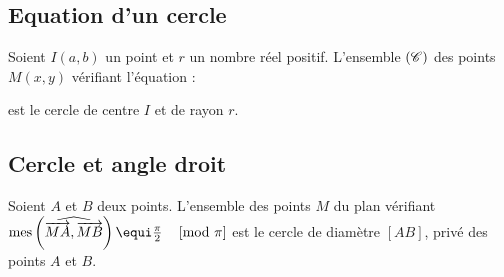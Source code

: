 		\subsection{Equation d'un cercle}
			Soient $I(a,b)$ un point et $r$ un nombre r\'eel positif.
				L'ensemble $(\mathscr{C})$ des points $M(x,y)$ v\'erifiant l'\'equation :
			\begin{center}
			\end{center}
			est le cercle de centre $I$ et de rayon $r$.
		\subsection{Cercle et angle droit}
			\begin{prop}
				Soient $A$ et $B$ deux points.
				L'ensemble des points $M$ du plan v\'erifiant $\congru{\mes{MA}{MB}}{\frac{\pi}{2}}{\pi}$
				est le cercle de diam\`etre $[AB]$, priv\'e des points $A$ et $B$.
				

\end{prop}
